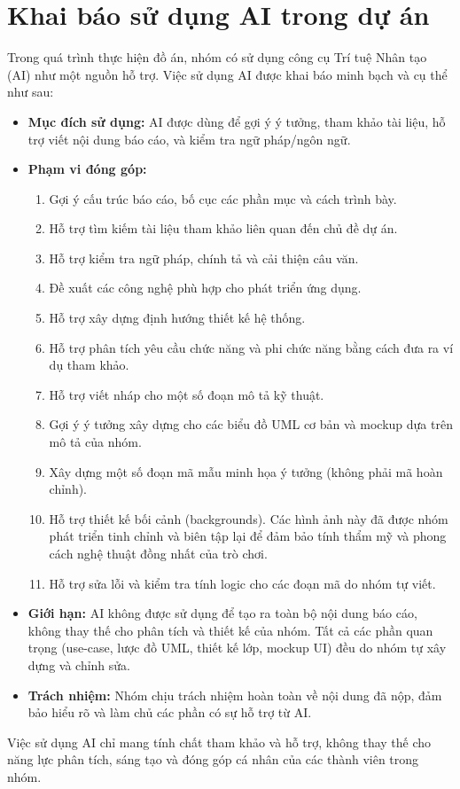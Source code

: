 \section{Khai báo sử dụng AI trong dự án}

Trong quá trình thực hiện đồ án, nhóm có sử dụng công cụ Trí tuệ Nhân tạo (AI) 
như một nguồn hỗ trợ. Việc sử dụng AI được khai báo minh bạch và cụ thể như sau:

\begin{itemize}
    \item \textbf{Mục đích sử dụng:} AI được dùng để gợi ý ý tưởng, tham khảo tài liệu, 
    hỗ trợ viết nội dung báo cáo, và kiểm tra ngữ pháp/ngôn ngữ. 
    \item \textbf{Phạm vi đóng góp:} 
    \begin{enumerate}
        \item Gợi ý cấu trúc báo cáo, bố cục các phần mục và cách trình bày.
        \item Hỗ trợ tìm kiếm tài liệu tham khảo liên quan đến chủ đề dự án.
        \item Hỗ trợ kiểm tra ngữ pháp, chính tả và cải thiện câu văn.
        \item Đề xuất các công nghệ phù hợp cho phát triển ứng dụng.
        \item Hỗ trợ xây dựng định hướng thiết kế hệ thống.
        \item Hỗ trợ phân tích yêu cầu chức năng và phi chức năng bằng cách đưa ra ví dụ tham khảo.
        \item Hỗ trợ viết nháp cho một số đoạn mô tả kỹ thuật.
        \item Gợi ý ý tưởng xây dựng cho các biểu đồ UML cơ bản và mockup dựa trên mô tả của nhóm.
        \item Xây dựng một số đoạn mã mẫu minh họa ý tưởng (không phải mã hoàn chỉnh).
        \item Hỗ trợ thiết kế bối cảnh (backgrounds). Các hình ảnh này đã được nhóm phát triển tinh chỉnh và biên tập lại để đảm bảo tính thẩm mỹ và phong cách nghệ thuật đồng nhất của trò chơi.
        \item Hỗ trợ sửa lỗi và kiểm tra tính logic cho các đoạn mã do nhóm tự viết.
    \end{enumerate}
    \item \textbf{Giới hạn:} AI không được sử dụng để tạo ra toàn bộ nội dung báo cáo, 
    không thay thế cho phân tích và thiết kế của nhóm. Tất cả các phần quan trọng 
    (use-case, lược đồ UML, thiết kế lớp, mockup UI) đều do nhóm 
    tự xây dựng và chỉnh sửa.
    \item \textbf{Trách nhiệm:} Nhóm chịu trách nhiệm hoàn toàn về nội dung đã nộp, 
    đảm bảo hiểu rõ và làm chủ các phần có sự hỗ trợ từ AI. 
\end{itemize}

\noindent Việc sử dụng AI chỉ mang tính chất tham khảo và hỗ trợ, không thay thế cho 
năng lực phân tích, sáng tạo và đóng góp cá nhân của các thành viên trong nhóm.